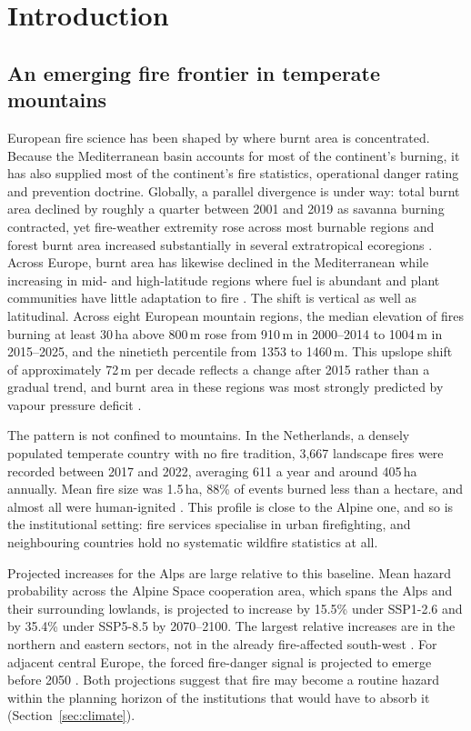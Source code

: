 \documentclass[11pt,a4paper]{article}
\begin{document}
\section{Introduction}
\label{sec:intro}

\subsection{An emerging fire frontier in temperate mountains}

European fire science has been shaped by where burnt area is concentrated. Because the Mediterranean basin accounts for most of the continent's burning, it has also supplied most of the continent's fire statistics, operational danger rating and prevention doctrine. Globally, a parallel divergence is under way: total burnt area declined by roughly a quarter between 2001 and 2019 as savanna burning contracted, yet fire-weather extremity rose across most burnable regions and forest burnt area increased substantially in several extratropical ecoregions \citep{jones_global_2022}. Across Europe, burnt area has likewise declined in the Mediterranean while increasing in mid- and high-latitude regions where fuel is abundant and plant communities have little adaptation to fire \citep{miller_compounding_2025}. The shift is vertical as well as latitudinal. Across eight European mountain regions, the median elevation of fires burning at least 30\,ha above 800\,m rose from 910\,m in 2000--2014 to 1004\,m in 2015--2025, and the ninetieth percentile from 1353 to 1460\,m. This upslope shift of approximately 72\,m per decade reflects a change after 2015 rather than a gradual trend, and burnt area in these regions was most strongly predicted by vapour pressure deficit \citep{beloiu_climatedriven_2026}.

The pattern is not confined to mountains. In the Netherlands, a densely populated temperate country with no fire tradition, 3{,}667 landscape fires were recorded between 2017 and 2022, averaging 611 a year and around 405\,ha annually. Mean fire size was 1.5\,ha, 88\% of events burned less than a hectare, and almost all were human-ignited \citep{stoof_temperate_2024}. This profile is close to the Alpine one, and so is the institutional setting: fire services specialise in urban firefighting, and neighbouring countries hold no systematic wildfire statistics at all.

Projected increases for the Alps are large relative to this baseline. Mean hazard probability across the Alpine Space cooperation area, which spans the Alps and their surrounding lowlands, is projected to increase by 15.5\% under SSP1-2.6 and by 35.4\% under SSP5-8.5 by 2070--2100. The largest relative increases are in the northern and eastern sectors, not in the already fire-affected south-west \citep{gerberding_mapping_2025}. For adjacent central Europe, the forced fire-danger signal is projected to emerge before 2050 \citep{miller_climate_2024}. Both projections suggest that fire may become a routine hazard within the planning horizon of the institutions that would have to absorb it (Section~\ref{sec:climate}).
\end{document}
